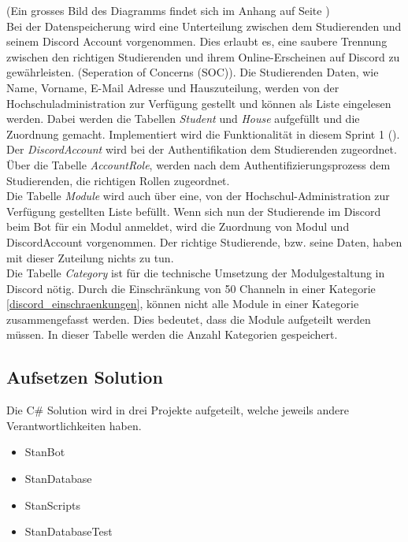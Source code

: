\documentclass[a4paper, table]{article}
\begin{document}
(Ein grosses Bild des Diagramms findet sich im Anhang auf Seite \pageref*{fig:ER-Diagram-big})\\
Bei der Datenspeicherung wird eine Unterteilung zwischen dem Studierenden und seinem Discord Account vorgenommen. 
Dies erlaubt es, eine saubere Trennung zwischen den richtigen Studierenden und ihrem Online-Erscheinen auf Discord zu gewährleisten. 
(Seperation of Concerns (SOC)). 
Die Studierenden Daten, wie Name, Vorname, E-Mail Adresse und Hauszuteilung, werden von der Hochschuladministration zur Verfügung gestellt und können als Liste eingelesen werden. 
Dabei werden die Tabellen \textit{Student} und \textit{House} aufgefüllt und die Zuordnung gemacht. 
Implementiert wird die Funktionalität in diesem Sprint 1 ().\\
Der \textit{DiscordAccount} wird bei der Authentifikation dem Studierenden zugeordnet.\\
Über die Tabelle \textit{AccountRole}, werden nach dem Authentifizierungsprozess dem Studierenden, die richtigen Rollen zugeordnet.\\
Die Tabelle \textit{Module} wird auch über eine, von der Hochschul-Administration zur Verfügung gestellten Liste befüllt. 
Wenn sich nun der Studierende im Discord beim Bot für ein Modul anmeldet, wird die Zuordnung von Modul und DiscordAccount vorgenommen. 
Der richtige Studierende, \gls{bzw.} seine Daten, haben mit dieser Zuteilung nichts zu tun.\\
Die Tabelle \textit{Category} ist für die technische Umsetzung der Modulgestaltung in Discord nötig. 
Durch die Einschränkung von 50 Channeln in einer Kategorie \ref{discord_einschraenkungen}, können nicht alle Module in einer Kategorie zusammengefasst werden. 
Dies bedeutet, dass die Module aufgeteilt werden müssen. 
In dieser Tabelle werden die Anzahl Kategorien gespeichert.

\subsection{Aufsetzen Solution}
Die C\# Solution wird in drei Projekte aufgeteilt, welche jeweils andere Verantwortlichkeiten haben.
\begin{itemize}
    \item StanBot
    \item StanDatabase
    \item StanScripts
    \item StanDatabaseTest
\end{itemize}
\end{document}
